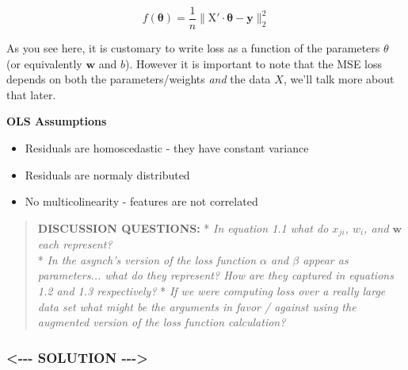 \documentclass[11pt]{article}
\providecommand{\tightlist}{%
      \setlength{\itemsep}{0pt}\setlength{\parskip}{0pt}}
\begin{document}
\begin{equation}\tag{1.4}
f(\boldsymbol{\theta}) = \frac{1}{n}\|\text{X}'\cdot \boldsymbol{\theta} - \mathbf{y}\|_2^2
\end{equation}

As you see here, it is customary to write loss as a function of the
parameters \(\theta\) (or equivalently \(\mathbf{w}\) and \(b\)).
However it is important to note that the MSE loss depends on both the
parameters/weights \emph{and} the data \(X\), we'll talk more about that
later.

\textbf{OLS Assumptions}

\begin{itemize}
\tightlist
\item
  Residuals are homoscedastic - they have constant variance\\
\item
  Residuals are normaly distributed
\item
  No multicolinearity - features are not correlated
\end{itemize}

    \begin{quote}
\textbf{DISCUSSION QUESTIONS:} * \emph{In equation 1.1 what do
\(x_{ji}\), \(w_i\), and \(\mathbf{w}\) each represent?}\\
* \emph{In the asynch's version of the loss function \(\alpha\) and
\(\beta\) appear as parameters... what do they represent? How are they
captured in equations 1.2 and 1.3 respectively?} * \emph{If we were
computing loss over a really large data set what might be the arguments
in favor / against using the augmented version of the loss function
calculation?}
\end{quote}

    \subsubsection{\textless{}-\/-\/- SOLUTION
-\/-\/-\textgreater{}}\label{solution----}
\end{document}
